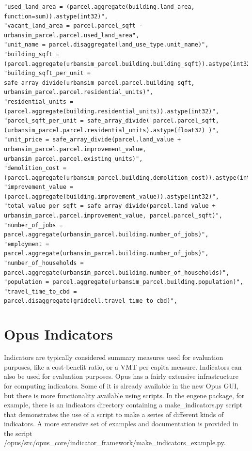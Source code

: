 \begin{lstlisting}
"used_land_area = (parcel.aggregate(building.land_area, function=sum)).astype(int32)",
"vacant_land_area = parcel.parcel_sqft - urbansim_parcel.parcel.used_land_area",
"unit_name = parcel.disaggregate(land_use_type.unit_name)",
"building_sqft = (parcel.aggregate(urbansim_parcel.building.building_sqft)).astype(int32)",
"building_sqft_per_unit = safe_array_divide(urbansim_parcel.parcel.building_sqft, urbansim_parcel.parcel.residential_units)",
"residential_units = (parcel.aggregate(building.residential_units)).astype(int32)",       
"parcel_sqft_per_unit = safe_array_divide( parcel.parcel_sqft, (urbansim_parcel.parcel.residential_units).astype(float32) )",
"unit_price = safe_array_divide(parcel.land_value + urbansim_parcel.parcel.improvement_value, urbansim_parcel.parcel.existing_units)",
"demolition_cost = (parcel.aggregate(urbansim_parcel.building.demolition_cost)).astype(int32)",
"improvement_value = (parcel.aggregate(building.improvement_value)).astype(int32)",
"total_value_per_sqft = safe_array_divide(parcel.land_value + urbansim_parcel.parcel.improvement_value, parcel.parcel_sqft)",
"number_of_jobs = parcel.aggregate(urbansim_parcel.building.number_of_jobs)",
"employment = parcel.aggregate(urbansim_parcel.building.number_of_jobs)",
"number_of_households = parcel.aggregate(urbansim_parcel.building.number_of_households)",
"population = parcel.aggregate(urbansim_parcel.building.population)",
"travel_time_to_cbd = parcel.disaggregate(gridcell.travel_time_to_cbd)",       
\end{lstlisting}

\section{Opus Indicators}

Indicators are typically considered summary measures used for evaluation purposes, like a cost-benefit ratio, or a VMT per capita measure.  Indicators can also be used for evaluation purposes.  Opus has a fairly extensive infrastructure for computing indicators.  Some of it is already available in the new Opus GUI, but there is more functionality available using scripts.  In the eugene package, for example, there is an indicators directory containing a make\_indicators.py script that demonstrates the use of a script to make a series of different kinds of indicators.  A more extensive set of examples and documentation is provided in the script  /opus/src/opus\_core/indicator\_framework/make\_indicators\_example.py.

